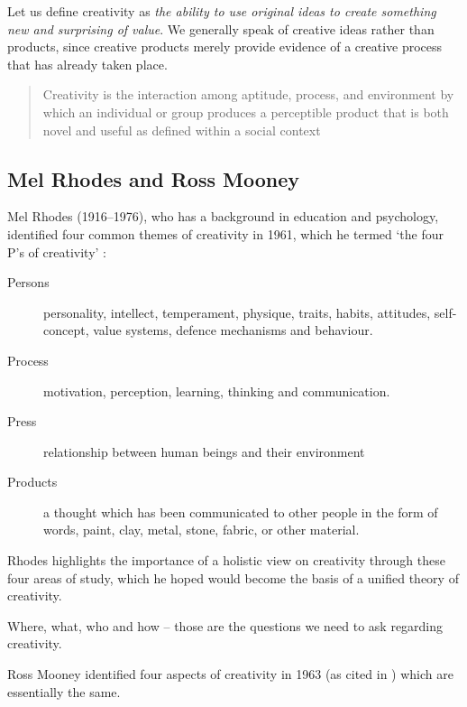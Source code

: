 Let us define creativity as \emph{the ability to use original ideas to create something new and surprising of value}. We generally speak of creative ideas rather than products, since creative products merely provide evidence of a creative process that has already taken place.

\begin{quotation}
  Creativity is the interaction among aptitude, process, and environment by which an individual or group produces a perceptible product that is both novel and useful as defined within a social context 
\end{quotation}


\subsection*{Mel Rhodes and Ross Mooney}

Mel Rhodes (1916--1976), who has a background in education and psychology, identified four common themes of creativity in 1961, which he termed `the four P\rq s of creativity' \autocite{Rhodes1961}:

\begin{description}
  \item [Persons] personality, intellect, temperament, physique, traits, habits, attitudes, self-concept, value systems, defence mechanisms and behaviour.
  \item [Process] motivation, perception, learning, thinking and communication.
  \item [Press] relationship between human beings and their environment
  \item [Products] a thought which has been communicated to other people in the form of words, paint, clay, metal, stone, fabric, or other material.
\end{description}

Rhodes highlights the importance of a holistic view on creativity through these four areas of study, which he hoped would become the basis of a unified theory of creativity.

\begin{draft}
  Where, what, who and how – those are the questions we need to ask regarding creativity.
\end{draft}

Ross Mooney identified four aspects of creativity in 1963 (as cited in \autocite{Sternberg1999}) which are essentially the same.


